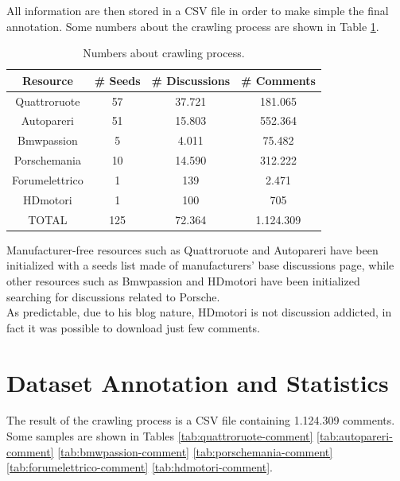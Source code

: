 All information are then stored in a CSV file in order to make simple the final annotation. Some numbers about the crawling process are shown in Table \ref{table:numbers-crawl}.

\begin{table}[ht]
	\renewcommand{\arraystretch}{2.5}
	\centering
	\begin{tabular}{| c | c | c | c | } 
		\hline
		\textbf{Resource} & \textbf{\# Seeds} & \textbf{\# Discussions} & \textbf{\# Comments} \\ [.2cm]
		\hline
		\hline
		Quattroruote & 57 & 37.721 & 181.065 \\ [.2cm]
		\hline
		Autopareri & 51 & 15.803 & 552.364 \\ [.2cm]
		\hline
		Bmwpassion & 5 & 4.011 & 75.482
		\\ [.2cm]
		\hline
		Porschemania & 10 & 14.590 & 312.222 \\ [.2cm]
		\hline
		Forumelettrico & 1 & 139 & 2.471 \\ [.2cm]
		\hline
		HDmotori & 1 & 100 & 705 \\ [.2cm]
		\hline
		\hline
		TOTAL & 125 & 72.364 & 1.124.309 \\ [.2cm]
		\hline
	\end{tabular}
	\caption{Numbers about crawling process.}
	\label{table:numbers-crawl}
\end{table}

Manufacturer-free resources such as Quattroruote and Autopareri have been initialized with a seeds list made of manufacturers' base discussions page, while other resources such as Bmwpassion and HDmotori have been initialized searching for discussions related to Porsche.\\
As predictable, due to his blog nature, HDmotori is not discussion addicted, in fact it was possible to download just few comments.



\section{Dataset Annotation and Statistics}

The result of the crawling process is a CSV file containing 1.124.309 comments. Some samples are shown in Tables \ref{tab:quattroruote-comment} \ref{tab:autopareri-comment} \ref{tab:bmwpassion-comment} \ref{tab:porschemania-comment} \ref{tab:forumelettrico-comment} \ref{tab:hdmotori-comment}.

